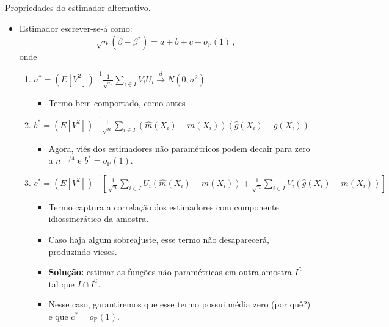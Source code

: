 \documentclass[11pt]{beamer}
\begin{document}
\begin{frame}{Propriedades do estimador alternativo.}
	\begin{itemize}
				\item Estimador escrever-se-á como:
	$$\sqrt{n}(\check{\beta} - \beta^*) =  a+b+c +o_{\mathbb{P}}(1)\, ,$$
	onde 
	\begin{enumerate}
		\item $a^{*}=\left(E\left[V^{2}\right]\right)^{-1} \frac{1}{\sqrt{n}} \sum_{i \in I} V_{i} U_{i} \overset{d}{\to} N(0, \sigma^2)$
		\begin{itemize}
			\item Termo bem comportado, como antes
		\end{itemize}
		\item $b^{*}=\left(E\left[V^{2}\right]\right)^{-1} \frac{1}{\sqrt{n}} \sum_{i \in I}\left(\hat{m}\left(X_{i}\right)-m\left(X_{i}\right)\right)\left(\hat{g}\left(X_{i}\right)-g\left(X_{i}\right)\right)$
		\begin{itemize}
			\item Agora, viés dos estimadores não paramétricos podem decair para zero a $n^{-1/4}$ e $b^* = o_{\mathbb{P}}(1)$.
		\end{itemize}
			\item {\footnotesize$c^{*}=\left(E\left[V^{2}\right]\right)^{-1} \left[\frac{1}{\sqrt{n}} \sum_{i \in I}U_i \left(\hat{m}\left(X_{i}\right)-m\left(X_{i}\right)\right)+ \frac{1}{\sqrt{n}} \sum_{i \in I}V_i\left(\hat{g}\left(X_{i}\right)-m\left(X_{i}\right)\right)\right] $}
			\begin{itemize}
				\item Termo captura a correlação dos estimadores com componente idiossincrático da amostra.
				\item Caso haja algum sobreajuste, esse termo não desaparecerá, produzindo vieses.
				\item \textbf{Solução:} estimar as funções não paramétricas em outra amostra $I^{\complement}$ tal que $I \cap I^{\complement}$.
					\item Nesse caso, garantiremos que esse termo possui média zero (por quê?) e que $c^* = o_{\mathbb{P}}(1)$.
			\end{itemize}
	\end{enumerate}			
\end{itemize}
\end{frame}
\end{document}
